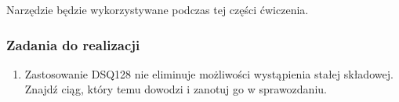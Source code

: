 Narzędzie będzie wykorzystywane podczas tej części ćwiczenia.

\clearpage

\subsubsection{Zadania do realizacji}

\begin{enumerate}
    \item Zastosowanie DSQ128 nie eliminuje możliwości wystąpienia stałej składowej. Znajdź ciąg, który
    temu dowodzi i zanotuj go w sprawozdaniu.
\end{enumerate}
